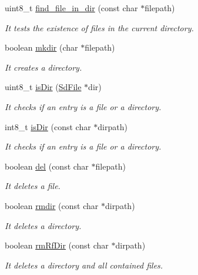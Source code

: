 \begin{DoxyCompactItemize}
uint8\+\_\+t \hyperlink{class_wasp_s_d_ab27a9d41c4a4f1fd0b63e32bcef05d97}{find\+\_\+file\+\_\+in\+\_\+dir} (const char $\ast$filepath)
\begin{DoxyCompactList}\small\item\em It tests the existence of files in the current directory. \end{DoxyCompactList}\item 
boolean \hyperlink{class_wasp_s_d_a83c69f275ca5474af72a0fdf65adc403}{mkdir} (char $\ast$filepath)
\begin{DoxyCompactList}\small\item\em It creates a directory. \end{DoxyCompactList}\item 
uint8\+\_\+t \hyperlink{class_wasp_s_d_a5aa32dc5b6b5f4407b25bd01cce87e54}{is\+Dir} (\hyperlink{class_sd_file}{Sd\+File} $\ast$dir)
\begin{DoxyCompactList}\small\item\em It checks if an entry is a file or a directory. \end{DoxyCompactList}\item 
int8\+\_\+t \hyperlink{class_wasp_s_d_a316c9fb28adcb4228e7a9cc81c7f0697}{is\+Dir} (const char $\ast$dirpath)
\begin{DoxyCompactList}\small\item\em It checks if an entry is a file or a directory. \end{DoxyCompactList}\item 
boolean \hyperlink{class_wasp_s_d_a6430feba6d1ebd9b81e0d97f9dca991c}{del} (const char $\ast$filepath)
\begin{DoxyCompactList}\small\item\em It deletes a file. \end{DoxyCompactList}\item 
boolean \hyperlink{class_wasp_s_d_a5cb6e319b94438592bae491f933fed4d}{rmdir} (const char $\ast$dirpath)
\begin{DoxyCompactList}\small\item\em It deletes a directory. \end{DoxyCompactList}\item 
boolean \hyperlink{class_wasp_s_d_a969ad23ebf28f6df951dc886d7215bee}{rm\+Rf\+Dir} (const char $\ast$dirpath)
\begin{DoxyCompactList}\small\item\em It deletes a directory and all contained files. \end{DoxyCompactList}\item 

\end{DoxyCompactItemize}
